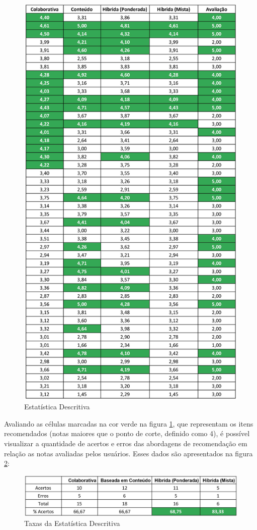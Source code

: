 \begin{figure}[H]
	\centering
	\includegraphics[width=0.8\linewidth]{imagens/estatisticaDescritiva.jpg}
	\caption[Estatística Descritiva]{Estatística Descritiva}
    \label{fig:analiseDescritiva}
\end{figure}

Avaliando as células marcadas na cor verde na figura \ref{fig:analiseDescritiva}, que representam os itens recomendados (notas maiores que o ponto de corte, definido como 4), é possível visualizar a quantidade de acertos e erros das abordagens de recomendação em relação as notas avaliadas pelos usuários. Esses dados são apresentados na figura \ref{fig:analiseDescritivaTaxas}:

\begin{figure}[H]
	\centering
	\includegraphics[width=.9\linewidth]{imagens/analiseDescritivaTaxas.jpg}
	\caption[Taxas da Estatística Descritiva]{Taxas da Estatística Descritiva}
    \label{fig:analiseDescritivaTaxas}
\end{figure}

